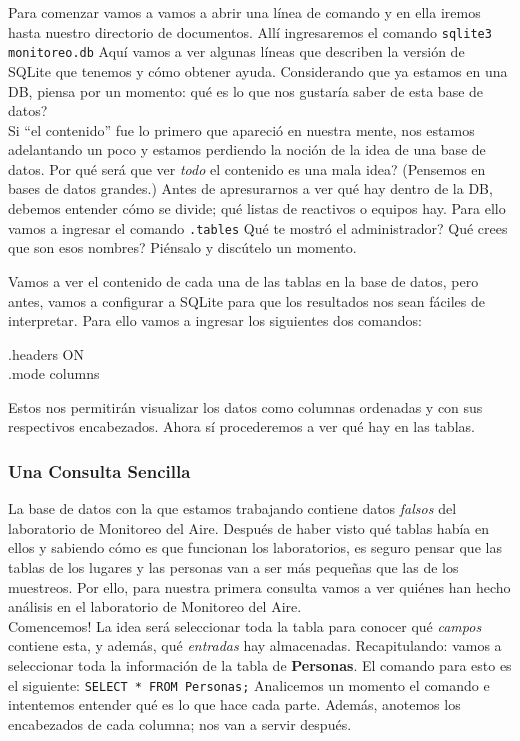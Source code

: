 \documentclass[10pt,letterpaper]{article}
\newcommand{\inlinecode}[1]{
\colorbox{light-gray}{\texttt{#1}}
}
\newenvironment{Code}
{
\begin{lrbox}{\selvestebox}%
\begin{minipage}{\dimexpr\columnwidth-2\fboxsep\relax}
\fontfamily{\ttdefault}\selectfont
}
{\end{minipage}\end{lrbox}%
\begin{center}
\colorbox{light-gray}{\usebox{\selvestebox}}
\end{center}
}
\begin{document}
Para comenzar vamos a vamos a abrir una l\'inea de comando y en ella iremos hasta nuestro directorio de documentos. All\'i ingresaremos el comando \inlinecode{sqlite3 monitoreo.db} Aqu\'i vamos a ver algunas l\'ineas que describen la versi\'on de SQLite que tenemos y c\'omo obtener ayuda. Considerando que ya estamos en una DB, piensa por un momento: qu\'e es lo que nos gustar\'ia saber de esta base de datos?\\

Si ``el contenido'' fue lo primero que apareci\'o en nuestra mente, nos estamos adelantando un poco y estamos perdiendo la noci\'on de la idea de una base de datos. Por qu\'e ser\'a que ver \emph{todo} el contenido es una mala idea? (Pensemos en bases de datos grandes.) Antes de apresurarnos a ver qu\'e hay dentro de la DB, debemos entender c\'omo se divide; qu\'e listas de reactivos o equipos hay. Para ello vamos a ingresar el comando \inlinecode{.tables} Qu\'e te mostr\'o el administrador? Qu\'e crees que son esos nombres? Pi\'ensalo y disc\'utelo un momento.

Vamos a ver el contenido de cada una de las tablas en la base de datos, pero antes, vamos a configurar a SQLite para que los resultados nos sean f\'aciles de interpretar. Para ello vamos a ingresar los siguientes dos comandos:

\begin{Code}
.headers ON\\
.mode columns
\end{Code}

Estos nos permitir\'an visualizar los datos como columnas ordenadas y con sus respectivos encabezados. Ahora s\'i procederemos a ver qu\'e hay en las tablas.

\subsubsection{Una Consulta Sencilla}
La base de datos con la que estamos trabajando contiene datos \emph{falsos} del laboratorio de Monitoreo del Aire. Despu\'es de haber visto qu\'e tablas hab\'ia en ellos y sabiendo c\'omo es que funcionan los laboratorios, es seguro pensar que las tablas de los lugares y las personas van a ser m\'as peque\~nas que las de los muestreos. Por ello, para nuestra primera consulta vamos a ver qui\'enes han hecho an\'alisis en el laboratorio de Monitoreo del Aire.\\

Comencemos! La idea ser\'a seleccionar toda la tabla para conocer qu\'e \emph{campos} contiene esta, y adem\'as, qu\'e \emph{entradas} hay almacenadas. Recapitulando: vamos a seleccionar toda la informaci\'on de la tabla de \textbf{Personas}. El comando para esto es el siguiente: \inlinecode{SELECT * FROM Personas;} Analicemos un momento el comando e intentemos entender qu\'e es lo que hace cada parte. Adem\'as, anotemos los encabezados de cada columna; nos van a servir despu\'es.\\
\end{document}
